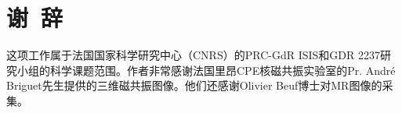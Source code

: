 \section*{谢\ 辞}

这项工作属于法国国家科学研究中心（CNRS）的PRC-GdR ISIS和GDR 2237研究小组的科学课题范围。作者非常感谢法国里昂CPE核磁共振实验室的Pr. André Briguet先生提供的三维磁共振图像。他们还感谢Olivier Beuf博士对MR图像的采集。
